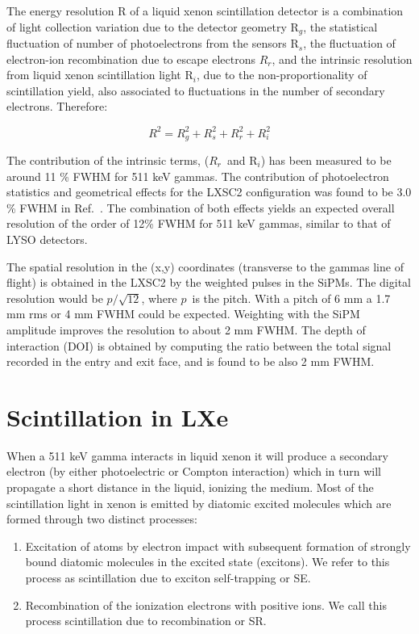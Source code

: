 \documentclass[review]{elsarticle}
\begin{document}
The energy resolution R of a liquid xenon scintillation detector is a combination of light collection variation due to the detector geometry R$_g$, the statistical fluctuation of number of photoelectrons from the sensors R$_s$, the fluctuation of electron-ion recombination due to escape electrons $R_r$, and the intrinsic resolution from liquid xenon scintillation light R$_i$, due to the non-proportionality of scintillation yield, also associated to fluctuations in the number of secondary electrons. Therefore:

\begin{equation}
R^2 = R_g^2 + R_s^2 + R_r^2 + R_i^2
\end{equation}

The contribution of the intrinsic terms, ($R_r$~and R$_i$) has been measured to be
around 11 \% FWHM \cite{aprileRes} for 511 keV gammas. The contribution of photoelectron statistics and geometrical effects for the LXSC2 configuration was found to be 3.0 \% FWHM
in Ref.~\cite{Petalo2015}. The combination of both effects yields an expected 
overall resolution of the order of 12\% FWHM for 511 keV gammas, similar to that of LYSO detectors. 

The spatial resolution in the (x,y) coordinates (transverse to the gammas line of flight) is obtained in the LXSC2 by the weighted pulses in the SiPMs. The digital resolution would be
$p/\sqrt{12}$, where $p$~is the pitch. With a pitch of 6 mm a 1.7 mm rms or 4 mm FWHM could be expected. Weighting with the SiPM amplitude improves the resolution to about 2 mm FWHM. The depth of interaction (DOI) is obtained by computing the ratio between the
total signal recorded in the entry and exit face, and is found to be also 2 mm FWHM. 

\section{Scintillation in LXe} \label{sec.scint}

When a 511 keV gamma interacts in liquid xenon it will produce a secondary electron (by either photoelectric or Compton interaction) which in turn will propagate a short distance in the liquid, ionizing the medium. Most of the scintillation light in xenon is emitted by diatomic excited molecules which are formed through two distinct processes:
\begin{enumerate}
\item Excitation of atoms by electron impact with subsequent formation of strongly bound diatomic molecules in the excited state (excitons). We refer to this process as scintillation due to exciton self-trapping or SE.
\item Recombination of the ionization electrons with positive ions. We call this process scintillation due to recombination or SR. 
\end{enumerate}
\end{document}
